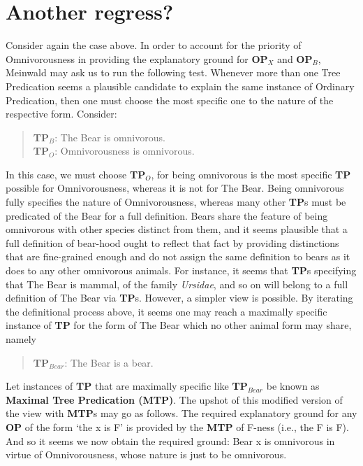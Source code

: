 \documentclass [article] {memoir}
\begin{document}
\chapter{Another regress?}
Consider again the case above. In order to account for the priority of Omnivorousness in providing the explanatory ground for \textbf{OP$_X$} and \textbf{OP$_B$}, Meinwald may ask us to run the following test. Whenever more than one Tree Predication seems a plausible candidate to explain the same instance of Ordinary Predication, then one must choose the most specific one to the nature of the respective form. Consider: 
\begin{quote}
\textbf{TP$_B$}: The Bear is omnivorous.\\
\textbf{TP$_O$}: Omnivorousness is omnivorous.
\end{quote}
In this case, we must choose \textbf{TP$_O$}, for being omnivorous is the most specific \textbf{TP} possible for Omnivorousness, whereas it is not for The Bear. Being omnivorous fully specifies the nature of Omnivorousness, whereas many other \textbf{TP}s must be predicated of the Bear for a full definition. Bears share the feature of being omnivorous with other species distinct from them, and it seems plausible that a full definition of bear-hood ought to reflect that fact by providing distinctions that are fine-grained enough and do not assign the same definition to bears as it does to any other omnivorous animals. For instance, it seems that \textbf{TP}s specifying that The Bear is mammal, of the family \textit{Ursidae}, and so on will belong to a full definition of The Bear via \textbf{TP}s. However, a simpler view is possible. By iterating the definitional process above, it seems one may reach a maximally specific instance of \textbf{TP} for the form of The Bear which no other animal form may share, namely 

\begin{quote}
\textbf{TP$_{Bear}$}: The Bear is a bear.
\end{quote} 

Let instances of \textbf{TP} that are maximally specific like \textbf{TP$_{Bear}$} be known as \textbf{Maximal Tree Predication (MTP)}. The upshot of this modified version of the view with \textbf{MTP}s may go as follows. The required explanatory ground for any \textbf{OP} of the form `the x is F' is provided by the \textbf{MTP} of F-ness (i.e., the F is F). And so it seems we now obtain the required ground: Bear x is omnivorous in virtue of Omnivorousness, whose nature is just to be omnivorous.
\end{document}
